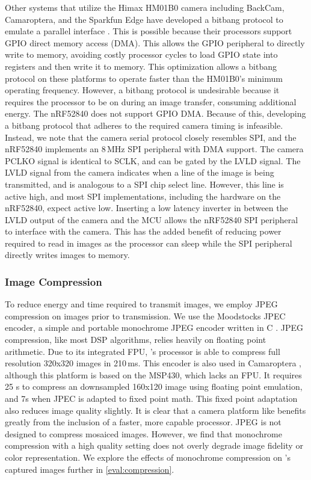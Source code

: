 Other systems that utilize the Himax HM01B0 camera including BackCam, Camaroptera, and the Sparkfun Edge have developed a bitbang protocol to emulate a parallel interface \cite{josephson2019wireless, nardello2019camaroptera, sparkfunedge}. This is possible because their processors support GPIO direct memory access (DMA). This allows the GPIO peripheral to directly write to memory, avoiding costly processor cycles to load GPIO state into registers and then write it to memory. This optimization allows a bitbang protocol on these platforms to operate faster than the HM01B0's minimum operating frequency. However, a bitbang protocol is undesirable because it requires the processor to be on during an image transfer, consuming additional energy. The nRF52840 does not support GPIO DMA. 
Because of this, developing a bitbang protocol that adheres to the required camera timing is infeasible. 
Instead, we note that the camera serial protocol closely resembles SPI, and the nRF52840 implements an 8\,MHz SPI peripheral with DMA support. 
The camera PCLKO signal is identical to SCLK, and can be gated by the LVLD signal. 
The LVLD signal from the camera indicates when a line of the image is being transmitted, and is analogous to a SPI chip select line. However, this line is active high, and most SPI implementations, including the hardware on the nRF52840, expect active low. Inserting a low latency inverter in between the LVLD output of the camera and the MCU allows the nRF52840 SPI peripheral to interface with the camera. 
This has the added benefit of reducing power required to read in images as the processor can sleep while the SPI peripheral directly writes images to memory.

\subsubsection{Image Compression}
To reduce energy and time required to transmit images, we employ JPEG compression on images prior to transmission. We use the Moodstocks JPEC encoder, a simple and portable monochrome JPEG encoder written in C \cite{moodstocks}. JPEG compression, like most DSP algorithms, relies heavily on floating point arithmetic. Due to its integrated FPU, \namec{}'s processor is able to compress full resolution 320x320 images in 210\,ms.
This encoder is also used in Camaroptera \cite{nardello2019camaroptera}, although this platform is based on the MSP430, which lacks an FPU. It requires 25 s to compress an downsampled 160x120 image using floating point emulation, and 7s when JPEC is adapted to fixed point math. This fixed point adaptation also reduces image quality slightly. It is clear that a camera platform like \namec{} benefits greatly from the inclusion of a faster, more capable processor.
JPEG is not designed to compress mosaiced images. However, we find that monochrome compression with a high quality setting does not overly degrade image fidelity or color representation. We explore the effects of monochrome compression on \namec's captured images further in \cref{eval:compression}.


